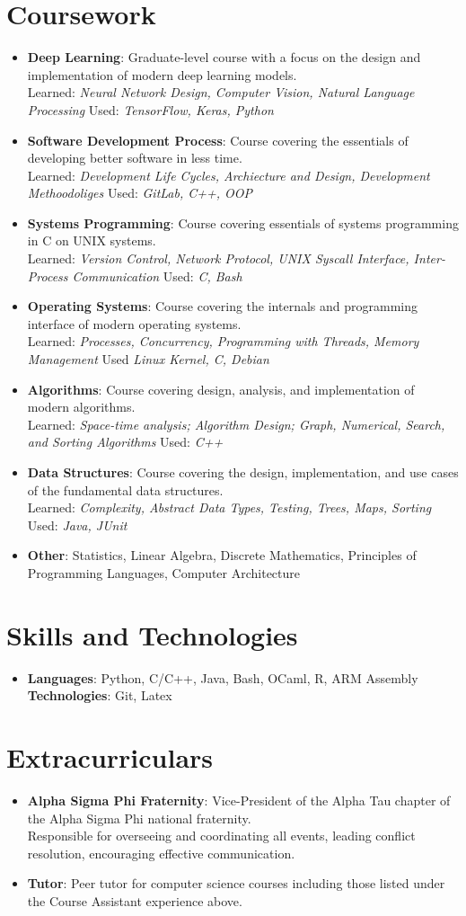 \documentclass[letterpaper,11pt]{article}
\newcommand{\resumeItem}[2]{
  \item\small{
    \textbf{#1}{: #2 \vspace{-2pt}}
  }
}
\newcommand{\resumeSubItem}[2]{\resumeItem{#1}{#2}\vspace{-4pt}}
\newcommand{\resumeItemListStart}{ \begin{itemize}[leftmargin=*] }
\newcommand{\resumeItemListEnd}{ \end{itemize} }
\begin{document}
\section{Coursework}
  \resumeItemListStart
    \resumeSubItem{Deep Learning}
    {Graduate-level course with a focus on the design and implementation of modern deep learning models. \\ Learned: \emph{Neural Network Design, Computer Vision, Natural Language Processing} \hfill Used: \emph{TensorFlow, Keras, Python}}
    \resumeSubItem{Software Development Process} 
    {Course covering the essentials of developing better software in less time. \\ Learned: \emph{Development Life Cycles, Archiecture and Design, Development Methoodoliges} \hfill Used: \emph{GitLab, C++, OOP}}
    \resumeSubItem{Systems Programming}
    {Course covering essentials of systems programming in C on UNIX systems. \\ Learned: \emph{Version Control, Network Protocol, UNIX Syscall Interface, Inter-Process Communication} \hfill Used: \emph{C, Bash}}
    \resumeSubItem{Operating Systems}
    {Course covering the internals and programming interface of modern operating systems. \\ Learned: \emph{Processes, Concurrency, Programming with Threads, Memory Management} \hfill Used \emph{Linux Kernel, C, Debian}}
    \resumeSubItem{Algorithms}
    {Course covering design, analysis, and implementation of modern algorithms. \\ Learned: \emph{Space-time analysis; Algorithm Design; Graph, Numerical, Search, and Sorting Algorithms} \hfill Used: \emph{C++}}
    \resumeSubItem{Data Structures}
    {Course covering the design, implementation, and use cases of the fundamental data structures. \\ Learned: \emph{Complexity, Abstract Data Types, Testing, Trees, Maps, Sorting} \hfill Used: \emph{Java, JUnit}}
    \resumeSubItem{Other}
    {Statistics, Linear Algebra, Discrete Mathematics, Principles of Programming Languages, Computer Architecture}
  \resumeItemListEnd


\section{Skills and Technologies}
  \resumeItemListStart
    \item{
      \textbf{Languages}{: Python, C/C++, Java, Bash, OCaml, R, ARM Assembly}
      \hfill
      \textbf{Technologies}{: Git, Latex}
    }
  \resumeItemListEnd


\section{Extracurriculars}
  \resumeItemListStart
    \resumeSubItem{Alpha Sigma Phi Fraternity}
    {Vice-President of the Alpha Tau chapter of the Alpha Sigma Phi national fraternity. \\
    Responsible for overseeing and coordinating all events, leading conflict resolution, encouraging effective communication.}
    \resumeSubItem{Tutor}
    {Peer tutor for computer science courses including those listed under the Course Assistant experience above.}
  \resumeItemListEnd
\end{document}
